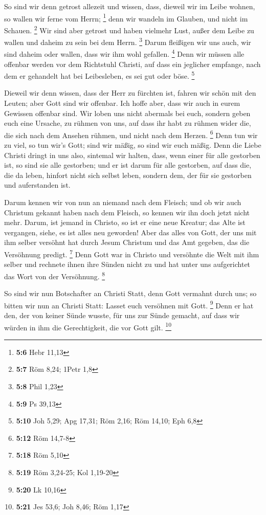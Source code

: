  So sind wir denn getrost allezeit und wissen, dass,
dieweil wir im Leibe wohnen, so wallen wir ferne vom Herrn; \footnote{\textbf{5:6}
  Hebr 11,13}  denn wir wandeln im Glauben, und nicht im
Schauen. \footnote{\textbf{5:7} Röm 8,24; 1Petr 1,8}  Wir
sind aber getrost und haben vielmehr Lust, außer dem Leibe zu wallen und
daheim zu sein bei dem Herrn. \footnote{\textbf{5:8} Phil 1,23}
 Darum fleißigen wir uns auch, wir sind daheim oder
wallen, dass wir ihm wohl gefallen. \footnote{\textbf{5:9} Ps 39,13}
 Denn wir müssen alle offenbar werden vor dem Richtstuhl
Christi, auf dass ein jeglicher empfange, nach dem er gehandelt hat bei
Leibesleben, es sei gut oder böse. \footnote{\textbf{5:10} Joh 5,29; Apg
  17,31; Röm 2,16; Röm 14,10; Eph 6,8}

 Dieweil wir denn wissen, dass der Herr zu fürchten ist,
fahren wir schön mit den Leuten; aber Gott sind wir offenbar. Ich hoffe
aber, dass wir auch in eurem Gewissen offenbar sind.  Wir
loben uns nicht abermals bei euch, sondern geben euch eine Ursache, zu
rühmen von uns, auf dass ihr habt zu rühmen wider die, die sich nach dem
Ansehen rühmen, und nicht nach dem Herzen. \footnote{\textbf{5:12} Röm
  14,7-8}  Denn tun wir zu viel, so tun wir's Gott; sind
wir mäßig, so sind wir euch mäßig.  Denn die Liebe
Christi dringt in uns also, sintemal wir halten, dass, wenn einer für
alle gestorben ist, so sind sie alle gestorben;  und er
ist darum für alle gestorben, auf dass die, die da leben, hinfort nicht
sich selbst leben, sondern dem, der für sie gestorben und auferstanden
ist.

 Darum kennen wir von nun an niemand nach dem Fleisch;
und ob wir auch Christum gekannt haben nach dem Fleisch, so kennen wir
ihn doch jetzt nicht mehr.  Darum, ist jemand in Christo,
so ist er eine neue Kreatur; das Alte ist vergangen, siehe, es ist alles
neu geworden!  Aber das alles von Gott, der uns mit ihm
selber versöhnt hat durch Jesum Christum und das Amt gegeben, das die
Versöhnung predigt. \footnote{\textbf{5:18} Röm 5,10} 
Denn Gott war in Christo und versöhnte die Welt mit ihm selber und
rechnete ihnen ihre Sünden nicht zu und hat unter uns aufgerichtet das
Wort von der Versöhnung. \footnote{\textbf{5:19} Röm 3,24-25; Kol
  1,19-20}

 So sind wir nun Botschafter an Christi Statt, denn Gott
vermahnt durch uns; so bitten wir nun an Christi Statt: Lasset euch
versöhnen mit Gott. \footnote{\textbf{5:20} Lk 10,16} 
Denn er hat den, der von keiner Sünde wusste, für uns zur Sünde gemacht,
auf dass wir würden in ihm die Gerechtigkeit, die vor Gott gilt.
\footnote{\textbf{5:21} Jes 53,6; Joh 8,46; Röm 1,17}

